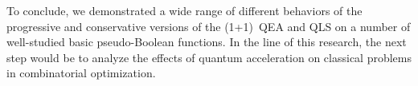 \documentclass[a4paper,11pt]{article}
\begin{document}
To conclude, we demonstrated a wide range of different behaviors of the progressive and conservative versions of the (1+1)~QEA and QLS on a number of well-studied basic pseudo-Boolean functions. In the line of this research, the next step would be to analyze the effects of quantum acceleration on classical problems in combinatorial optimization.



\end{document}
